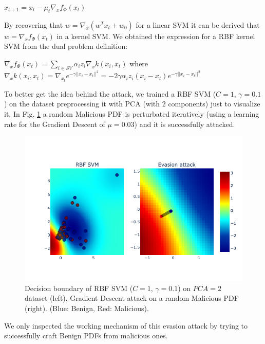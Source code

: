 \documentclass[twocolumn, switch]{article} %
\newcommand\x{0.7}
\begin{document}
\begin{center}
	$x_{t+1} = x_t - \mu_t\nabla_xf_{\Phi}(x_t)$
\end{center}
By recovering that $w = \nabla_x(w^Tx_t+w_0)$ for a linear SVM it can be derived that $w = \nabla_xf_{\Phi}(x_t)$ in a kernel SVM.
We obtained the expression for a RBF kernel SVM from the dual problem definition:
\begin{center}
	$\nabla_xf_{\Phi}(x_t) = \sum_{i \in SV}^{}\alpha_iz_i\nabla_xk(x_i,x_t)$
	where $\nabla_xk(x_i,x_t) = \nabla_{x_t}e^{-\gamma||x_i-x_t||^2}=-2\gamma\alpha_i z_i(x_i - x_t)e^{-\gamma||x_i-x_t||^2}$
\end{center}
To better get the idea behind the attack, we trained a RBF SVM ($C=1$, $\gamma=0.1$) on the dataset preprocessing it with PCA (with 2 components) just to visualize it. In Fig. \ref{fig:svmattack} a random Malicious PDF is perturbated iteratively (using a learning rate for the Gradient Descent of $\mu=0.03$) and it is successfully attacked.
\begin{figure}[ht!]
	\centering
	\includegraphics[width=\x\linewidth]{svmattack.png}
	\caption{Decision boundary of RBF SVM ($C=1$, $\gamma=0.1$) on $PCA=2$ dataset (left), Gradient Descent attack on a random Malicious PDF (right). (Blue: Benign, Red: Malicious).}
	\label{fig:svmattack}
\end{figure}
We only inspected the working mechanism of this evasion attack by trying to successfully craft Benign PDFs from malicious ones.
\end{document}
